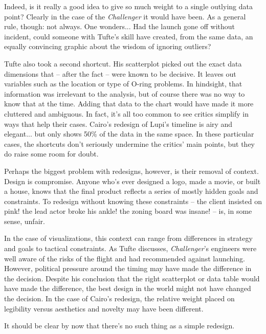 \documentclass[sigconf,nonacm,screen,pbalance]{acmart}
\begin{document}
Indeed, is it really a good idea to give so much weight to a
single outlying data point? Clearly in the case of the {\em Challenger} it
would have been. As a general rule, though: not always. One wonders... Had the launch gone
off without incident, could someone with Tufte's skill have created, from the same data,
an equally convincing graphic about the wisdom of ignoring outliers?

Tufte also took a second shortcut. His scatterplot picked out
the exact data dimensions that -- after the fact -- were known to be decisive. It leaves out
variables such as the location or type of O-ring problems. In hindsight, that information
was irrelevant to the analysis, but of course there was no way to know that at the time.
Adding that data to the chart would have made it more cluttered and ambiguous. In fact,
it's all too common to see critics simplify in ways that help their cases. Cairo's
redesign of Lupi's timeline is airy and elegant... but only shows 50\% of the data in the
same space. In these particular cases, the shortcuts don't seriously undermine the
critics' main points, but they do raise some room for doubt.

Perhaps the biggest problem with redesigns, however, is their
removal of context. Design is compromise. Anyone who's ever designed a logo, made a movie,
or built a house, knows that the final product reflects a series of mostly hidden goals
and constraints. To redesign without knowing these constraints -- the client insisted on
pink! the lead actor broke his ankle! the zoning board was insane! -- is, in some sense,
unfair.

In the case of visualizations, this context can range from
differences in strategy and goals to tactical constraints. As Tufte discusses,
{\em Challenger}'s engineers were well aware of the risks of the flight and
had recommended against launching. However, political pressure around the timing may have
made the difference in the decision. Despite his conclusion that the right scatterplot or
data table would have made the difference, the best design in the world might not have
changed the decision. In the case of Cairo's redesign, the relative weight placed on
legibility versus aesthetics and novelty may have been different.

It should be clear by now that there's no such thing as a
simple redesign.
\end{document}
